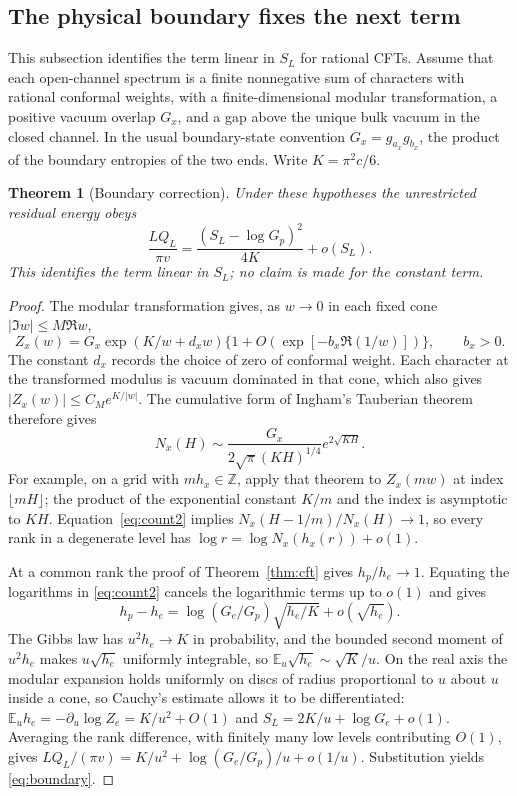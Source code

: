 \documentclass[11pt,a4paper]{article}
\newtheorem{theorem}{Theorem}
\theoremstyle{remark}
\newcommand{\E}{\mathbb E}
\begin{document}
\subsection{The physical boundary fixes the next term}
This subsection identifies the term linear in $S_L$ for rational CFTs. Assume that each open-channel spectrum is a finite nonnegative sum of characters with rational conformal weights, with a finite-dimensional modular transformation, a positive vacuum overlap $G_x$, and a gap above the unique bulk vacuum in the closed channel. In the usual boundary-state convention $G_x=g_{a_x}g_{b_x}$, the product of the boundary entropies of the two ends. Write $K=\pi^2 c/6$.

\begin{theorem}[Boundary correction]\label{thm:boundary}
Under these hypotheses the unrestricted residual energy obeys
\begin{equation}
 \frac{LQ_L}{\pi v}=
 \frac{(S_L-\log G_p)^2}{4K}+o(S_L).
 \label{eq:boundary}
\end{equation}
This identifies the term linear in $S_L$; no claim is made for the constant term.
\end{theorem}
\begin{proof}
The modular transformation gives, as $w\to0$ in each fixed cone $|\Im w|\le M\Re w$,
\[
 Z_x(w)=G_x\exp(K/w+d_x w)
 \{1+O(\exp[-b_x\Re(1/w)])\},\qquad b_x>0 .
\]
The constant $d_x$ records the choice of zero of conformal weight. Each character at the transformed modulus is vacuum dominated in that cone, which also gives $|Z_x(w)|\le C_M e^{K/|w|}$. The cumulative form of Ingham's Tauberian theorem \cite[Theorem 1.1]{ingham} therefore gives
\begin{equation}
 N_x(H)\sim\frac{G_x}{2\sqrt{\pi}(KH)^{1/4}}e^{2\sqrt{KH}} .
 \label{eq:count2}
\end{equation}
For example, on a grid with $m h_x\in\mathbb Z$, apply that theorem to $Z_x(mw)$ at index $\lfloor mH\rfloor$; the product of the exponential constant $K/m$ and the index is asymptotic to $KH$. Equation~\eqref{eq:count2} implies $N_x(H-1/m)/N_x(H)\to1$, so every rank in a degenerate level has $\log r=\log N_x(h_x(r))+o(1)$.

At a common rank the proof of Theorem~\ref{thm:cft} gives $h_p/h_e\to1$. Equating the logarithms in \eqref{eq:count2} cancels the logarithmic terms up to $o(1)$ and gives
\[
 h_p-h_e=\log(G_e/G_p)\sqrt{h_e/K}+o(\sqrt{h_e}).
\]
The Gibbs law has $u^2 h_e\to K$ in probability, and the bounded second moment of $u^2h_e$ makes $u\sqrt{h_e}$ uniformly integrable, so $\E_u\sqrt{h_e}\sim\sqrt K/u$. On the real axis the modular expansion holds uniformly on discs of radius proportional to $u$ about $u$ inside a cone, so Cauchy's estimate allows it to be differentiated: $\E_u h_e=-\partial_u\log Z_e=K/u^2+O(1)$ and $S_L=2K/u+\log G_e+o(1)$. Averaging the rank difference, with finitely many low levels contributing $O(1)$, gives $LQ_L/(\pi v)=K/u^2+\log(G_e/G_p)/u+o(1/u)$. Substitution yields \eqref{eq:boundary}.
\end{proof}
\end{document}
